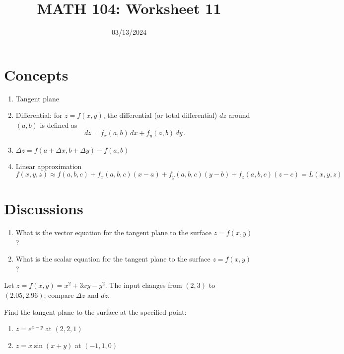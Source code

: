 \documentclass[12pt]{amsart}
\title{ MATH 104: Worksheet 11}
\author{}
\date{03/13/2024}
\begin{document}
\maketitle


\section{Concepts}

\begin{enumerate}
	\item Tangent plane
	\item Differential: for $z = f(x,y)$, the differential (or total differential) $dz$ around $(a,b)$ is defined as
	      \begin{equation*}
		      dz = f_x (a,b) \, dx + f_y(a,b) \, dy \,.
	      \end{equation*}
	\item $\Delta z = f(a+ \Delta x, b+ \Delta y) - f(a,b)$
	\item Linear approximation
	      \begin{equation*}
		      f(x,y,z) \approx f(a,b,c) + f_x(a,b,c) (x-a) + f_y(a,b,c) (y-b) + f_z(a,b,c) (z-c) = L(x,y,z)
	      \end{equation*}
\end{enumerate}

\section{Discussions}

\begin{question}
	\begin{enumerate}
		\item What is the vector equation for the tangent plane to the surface $z = f(x,y)$?
		      \vspace{7cm}
		\item What is the scalar equation for the tangent plane to the surface $z = f(x,y)$?
		      \vspace{7cm}
	\end{enumerate}
\end{question}

\begin{question}
	Let $z = f(x,y) = x^2 + 3xy - y^2$. The input changes from $(2,3)$ to $(2.05, 2.96)$, compare $\Delta z$ and $dz$.
	\vspace{7cm}
\end{question}

\begin{question}
	Find the tangent plane to the surface at the specified point:

	\begin{enumerate}
		\item $z = e^{x-y}$ at $(2,2,1)$
		      \vspace{7cm}
		\item $z = x\sin (x+y)$ at $(-1,1,0)$
		      \vspace{7cm}
	\end{enumerate}
\end{question}
\end{document}
